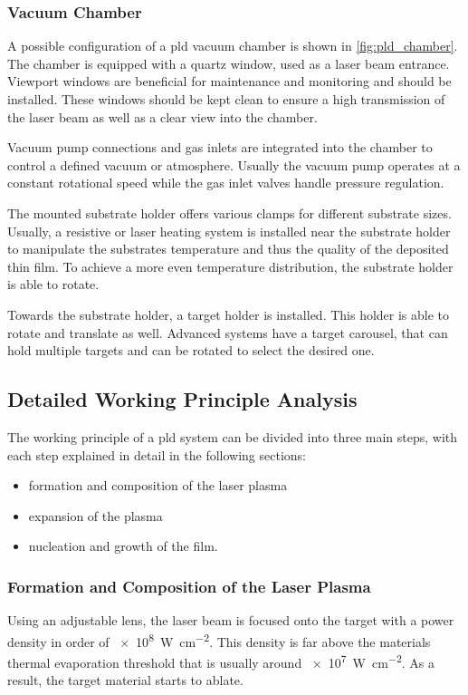 \subsubsection{Vacuum Chamber}
A possible configuration of a \ac{pld} vacuum chamber is shown in 
\cref{fig:pld_chamber}.
The chamber is equipped with a quartz window, used as a laser beam entrance.
Viewport windows are beneficial for maintenance and monitoring and should
be installed.
These windows should be kept clean to ensure a high transmission of the laser beam
as well as a clear view into the chamber.

Vacuum pump connections and gas inlets are integrated into the chamber
to control a defined vacuum or atmosphere.
Usually the vacuum pump operates at a constant rotational speed while the 
gas inlet valves handle pressure regulation. 

The mounted substrate holder offers various clamps for different substrate sizes.
Usually, a resistive or laser heating system is installed near the substrate holder to
manipulate the substrates temperature and thus the quality of the deposited thin film.
To achieve a more even temperature distribution, the substrate holder is able to rotate.

Towards the substrate holder, a target holder is installed.
This holder is able to rotate and translate as well.
Advanced systems have a target carousel, that can hold multiple targets and can be
rotated to select the desired one.

\subsection{Detailed Working Principle Analysis}
The working principle of a \ac{pld} system can be divided into three main steps, with
each step explained in detail in the following sections:
\begin{itemize}
	\item formation and composition of the laser plasma
	\item expansion of the plasma
	\item nucleation and growth of the film.
\end{itemize}

\subsubsection{Formation and Composition of the Laser Plasma}
Using an adjustable lens, the laser beam is focused onto the target 
with a power density in order of \qty{e8}{\watt\per\centi\meter\squared}.
This density is far above the materials thermal evaporation threshold that is usually 
around \qty{e7}{\watt\per\centi\meter\squared}.
As a result, the target material starts to ablate.

